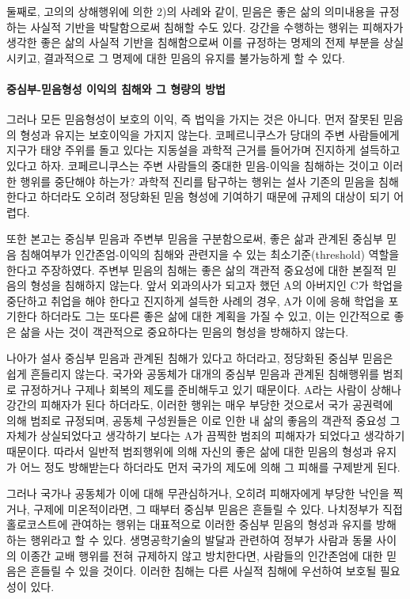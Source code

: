 둘째로, 고의의 상해행위에 의한 2)의 사례와 같이, 믿음은 좋은 삶의 의미내용을 규정하는 사실적 기반을 박탈함으로써 침해할 수도 있다. 강간을 수행하는 행위는 피해자가 생각한 좋은 삶의 사실적 기반을 침해함으로써 이를 규정하는 명제의 전제 부분을 상실시키고, 결과적으로 그 명제에 대한 믿음의 유지를 불가능하게 할 수 있다.

\paragraph{중심부-믿음형성 이익의 침해와 그 형량의 방법}

그러나 모든 믿음형성이 보호의 이익, 즉 법익을 가지는 것은 아니다. 먼저 잘못된 믿음의 형성과 유지는 보호이익을 가지지 않는다. 코페르니쿠스가 당대의 주변 사람들에게 지구가 태양 주위를 돌고 있다는 지동설을 과학적 근거를 들어가며 진지하게 설득하고 있다고 하자. 코페르니쿠스는 주변 사람들의 중대한 믿음-이익을 침해하는 것이고 이러한 행위를 중단해야 하는가? 과학적 진리를 탐구하는 행위는 설사 기존의 믿음을 침해한다고 하더라도 오히려 정당화된 믿음 형성에 기여하기 때문에 규제의 대상이 되기 어렵다.

또한 본고는 중심부 믿음과 주변부 믿음을 구분함으로써, 좋은 삶과 관계된 중심부 믿음 침해여부가 인간존엄-이익의 침해와 관련지을 수 있는 최소기준(threshold) 역할을 한다고 주장하였다. 주변부 믿음의 침해는 좋은 삶의 객관적 중요성에 대한 본질적 믿음의 형성을 침해하지 않는다. 앞서 외과의사가 되고자 했던 A의 아버지인 C가 학업을 중단하고 취업을 해야 한다고 진지하게 설득한 사례의 경우, A가 이에 응해 학업을 포기한다 하더라도 그는 또다른 좋은 삶에 대한 계획을 가질 수 있고, 이는 인간적으로 좋은 삶을 사는 것이 객관적으로 중요하다는 믿음의 형성을 방해하지 않는다.

나아가 설사 중심부 믿음과 관계된 침해가 있다고 하더라고, 정당화된 중심부 믿음은 쉽게 흔들리지 않는다. 국가와 공동체가 대개의 중심부 믿음과 관계된 침해행위를 범죄로 규정하거나 구제나 회복의 제도를 준비해두고 있기 때문이다. A라는 사람이 상해나 강간의 피해자가 된다 하더라도, 이러한 행위는 매우 부당한 것으로서 국가 공권력에 의해 범죄로 규정되며, 공동체 구성원들은 이로 인한 내 삶의 좋음의 객관적 중요성 그 자체가 상실되었다고 생각하기 보다는 A가 끔찍한 범죄의 피해자가 되었다고 생각하기 때문이다. 따라서 일반적 범죄행위에 의해 자신의 좋은 삶에 대한 믿음의 형성과 유지가 어느 정도 방해받는다 하더라도 먼저 국가의 제도에 의해 그 피해를 구제받게 된다.

그러나 국가나 공동체가 이에 대해 무관심하거나, 오히려 피해자에게 부당한 낙인을 찍거나, 구제에 미온적이라면, 그 때부터 중심부 믿음은 흔들릴 수 있다. 나치정부가 직접 홀로코스트에 관여하는 행위는 대표적으로 이러한 중심부 믿음의 형성과 유지를 방해하는 행위라고 할 수 있다. 생명공학기술의 발달과 관련하여 정부가 사람과 동물 사이의 이종간 교배 행위를 전혀 규제하지 않고 방치한다면, 사람들의 인간존엄에 대한 믿음은 흔들릴 수 있을 것이다. 이러한 침해는 다른 사실적 침해에 우선하여 보호될 필요성이 있다.

